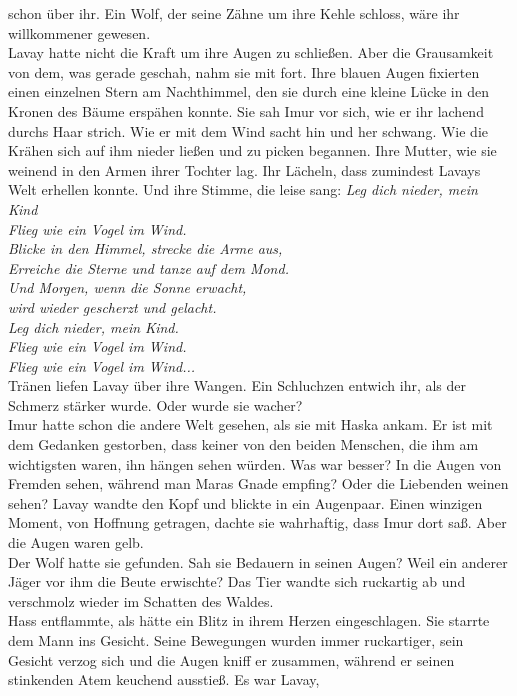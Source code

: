 schon über ihr. Ein Wolf, der seine Zähne um ihre Kehle schloss, wäre ihr willkommener gewesen.\\
Lavay hatte nicht die Kraft um ihre Augen zu schließen. Aber die Grausamkeit von dem, was gerade 
geschah, nahm sie mit fort. Ihre blauen Augen fixierten einen einzelnen Stern am Nachthimmel, den 
sie durch eine kleine Lücke in den Kronen des Bäume erspähen konnte. Sie sah Imur vor sich, wie er 
ihr lachend durchs Haar strich. Wie er mit dem Wind sacht hin und her schwang. Wie die Krähen 
sich auf ihm nieder ließen und zu picken begannen. Ihre Mutter, wie sie weinend in den Armen ihrer 
Tochter lag. Ihr Lächeln, dass zumindest Lavays Welt erhellen konnte. Und ihre Stimme, die leise 
sang: \textit{Leg dich nieder, mein Kind\\
Flieg wie ein Vogel im Wind.\\
Blicke in den Himmel, strecke die Arme aus,\\
Erreiche die Sterne und tanze auf dem Mond.\\
Und Morgen, wenn die Sonne erwacht,\\
wird wieder gescherzt und gelacht.\\ 
Leg dich nieder, mein Kind.\\
Flieg wie ein Vogel im Wind.\\
Flieg wie ein Vogel im Wind...}\\
Tränen liefen Lavay über ihre Wangen. Ein Schluchzen entwich ihr, als der Schmerz stärker wurde. 
Oder wurde sie wacher?\\
Imur hatte schon die andere Welt gesehen, als sie mit Haska ankam. Er ist mit dem Gedanken 
gestorben, dass keiner von den beiden Menschen, die ihm am wichtigsten waren, ihn hängen sehen 
würden. Was war besser? In die Augen von Fremden sehen, während man Maras Gnade empfing? Oder die 
Liebenden weinen sehen? Lavay wandte den Kopf und blickte in ein Augenpaar. Einen winzigen Moment, 
von Hoffnung getragen, dachte sie wahrhaftig, dass Imur dort saß. Aber die Augen waren gelb.\\
Der Wolf hatte sie gefunden. Sah sie Bedauern in seinen Augen? Weil ein anderer Jäger vor ihm die 
Beute erwischte? Das Tier wandte sich ruckartig ab und verschmolz wieder im Schatten des Waldes.\\
Hass entflammte, als hätte ein Blitz in ihrem Herzen eingeschlagen. Sie starrte dem Mann ins 
Gesicht. Seine Bewegungen wurden immer ruckartiger, sein Gesicht verzog sich 
und die Augen kniff er zusammen, während er seinen stinkenden Atem keuchend ausstieß. Es war Lavay, 
